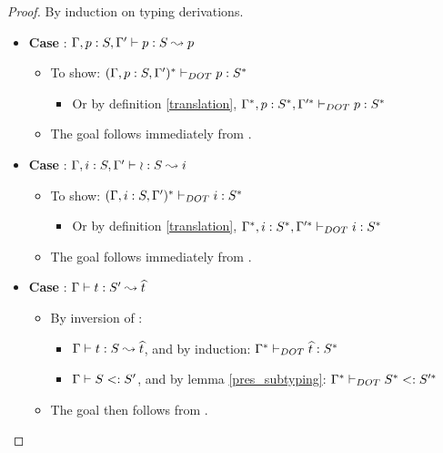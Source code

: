 \begin{proof}
    By induction on typing derivations.
    \begin{itemize}
        \item \textbf{Case} : $\Gamma, p: S, \Gamma' \vdash p: S \leadsto p$
        \begin{itemize}
            \item To show: $(\Gamma, p: S, \Gamma')^{*} \vdash_{DOT} p: S^{*}$
            \begin{itemize}
                \item Or by definition \ref{translation}, 
                    $\Gamma^{*}, p: S^{*},
                    \Gamma'^{*} \vdash_{DOT} p: S^{*}$
            \end{itemize}
            \item The goal follows immediately from .
        \end{itemize}
        \item \textbf{Case} :
            $\Gamma, i: S, \Gamma' \vdash \wr: S \leadsto i$
        \begin{itemize}
            \item To show: $(\Gamma, i: S, \Gamma')^{*} \vdash_{DOT} i: S^{*}$
            \begin{itemize}
                \item Or by definition \ref{translation}, 
                    $\Gamma^{*}, i: S^{*},
                    \Gamma'^{*} \vdash_{DOT} i: S^{*}$
            \end{itemize}
            \item The goal follows immediately from .
        \end{itemize}
        \item \textbf{Case} : $\Gamma \vdash t: S' \leadsto \widehat{t}$
        \begin{itemize}
            \item By inversion of :
            \begin{itemize}
                \item $\Gamma \vdash t: S \leadsto \widehat{t}$, and by induction:
                    $\Gamma^{*} \vdash_{DOT} \widehat{t}: S^{*}$
                \item $\Gamma \vdash S <: S'$, and by lemma \ref{pres_subtyping}:
                    $\Gamma^{*} \vdash_{DOT} S^{*} <: S'^{*}$
            \end{itemize}
            \item The goal then follows from .

\end{itemize}
\end{itemize}
\end{proof}
